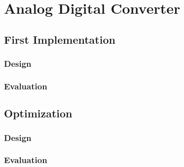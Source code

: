 \chapter{Analog Digital Converter}

\section{First Implementation}

\subsection{Design}
\subsection{Evaluation}

\section{Optimization}

\subsection{Design}
\subsection{Evaluation}
